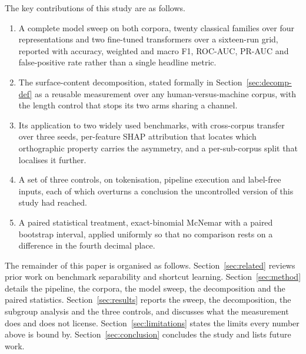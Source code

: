 \documentclass[conference,a4paper]{IEEEtran}
\begin{document}
The key contributions of this study are as follows.
\begin{enumerate}
    \item A complete model sweep on both corpora, twenty classical families over four representations and two fine-tuned transformers over a sixteen-run grid, reported with accuracy, weighted and macro F1, ROC-AUC, PR-AUC and false-positive rate rather than a single headline metric.
    \item The surface-content decomposition, stated formally in Section~\ref{sec:decomp-def} as a reusable measurement over any human-versus-machine corpus, with the length control that stops its two arms sharing a channel.
    \item Its application to two widely used benchmarks, with cross-corpus transfer over three seeds, per-feature SHAP attribution that locates which orthographic property carries the asymmetry, and a per-sub-corpus split that localises it further.
    \item A set of three controls, on tokenisation, pipeline execution and label-free inputs, each of which overturns a conclusion the uncontrolled version of this study had reached.
    \item A paired statistical treatment, exact-binomial McNemar with a paired bootstrap interval, applied uniformly so that no comparison rests on a difference in the fourth decimal place.
\end{enumerate}

The remainder of this paper is organised as follows. Section~\ref{sec:related} reviews prior work on benchmark separability and shortcut learning. Section~\ref{sec:method} details the pipeline, the corpora, the model sweep, the decomposition and the paired statistics. Section~\ref{sec:results} reports the sweep, the decomposition, the subgroup analysis and the three controls, and discusses what the measurement does and does not license. Section~\ref{sec:limitations} states the limits every number above is bound by. Section~\ref{sec:conclusion} concludes the study and lists future work.


\end{document}
